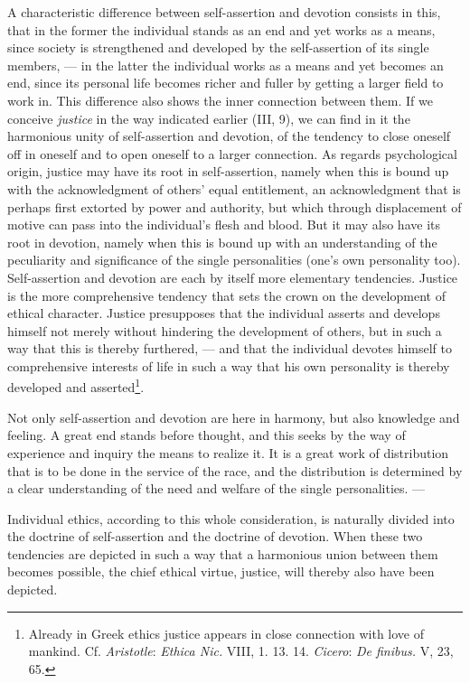 \documentclass[12pt,a4paper,openany]{book}
\newcommand{\opage}[1]{\marginnote{\footnotesize\textit{[#1]}}}
\begin{document}
A characteristic difference between self-assertion and devotion consists in this, that in the former the
individual stands as an end and yet works as a means, since society is strengthened and developed by the
self-assertion of its single members, --- in the latter the individual works as a means and yet becomes an end,
since its personal life becomes richer and fuller by getting a larger field to work in. This difference also
shows the inner connection between them. If we conceive \textit{justice} in the way indicated earlier (III, 9),
we can find in it the harmonious unity of self-assertion and devotion, of the tendency to close oneself off in
oneself and to open oneself to a larger connection.
\opage{188}As regards psychological origin, justice may have its root in self-assertion, namely when this is bound
up with the acknowledgment of others' equal entitlement, an acknowledgment that is perhaps first extorted by
power and authority, but which through displacement of motive can pass into the individual's flesh and blood.
But it may also have its root in devotion, namely when this is bound up with an understanding of the peculiarity
and significance of the single personalities (one's own personality too). Self-assertion and devotion are each
by itself more elementary tendencies. Justice is the more comprehensive tendency that sets the crown on the
development of ethical character. Justice presupposes that the individual asserts and develops himself not merely
without hindering the development of others, but in such a way that this is thereby furthered, --- and that the
individual devotes himself to comprehensive interests of life in such a way that his own personality is thereby
developed and asserted\footnote[1]{Already in Greek ethics justice appears in close connection with love of
mankind. Cf. \emph{Aristotle}: \textit{Ethica Nic.} VIII, 1. 13. 14. \emph{Cicero}: \textit{De finibus.} V, 23, 65.}.

Not only self-assertion and devotion are here in harmony, but also knowledge and feeling. A great end stands
before thought, and this seeks by the way of experience and inquiry the means to realize it. It is a great work
of distribution that is to be done in the service of the race, and the distribution is determined by a clear
understanding of the need and welfare of the single personalities. ---

Individual ethics, according to this whole consideration, is naturally divided into the doctrine of
self-assertion and the doctrine of devotion. When these two tendencies are depicted in such a way that a
harmonious union between them becomes possible, the chief ethical virtue, justice, will thereby also have been
depicted.
\end{document}
